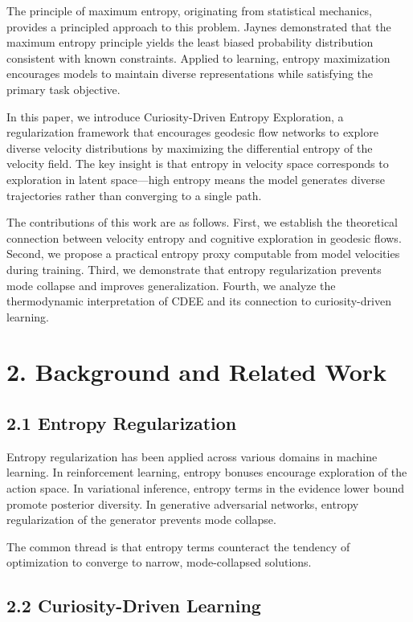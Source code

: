 \documentclass[12pt]{article}
\begin{document}
The principle of maximum entropy, originating from statistical mechanics, provides a principled approach to this problem. Jaynes demonstrated that the maximum entropy principle yields the least biased probability distribution consistent with known constraints. Applied to learning, entropy maximization encourages models to maintain diverse representations while satisfying the primary task objective.

In this paper, we introduce Curiosity-Driven Entropy Exploration, a regularization framework that encourages geodesic flow networks to explore diverse velocity distributions by maximizing the differential entropy of the velocity field. The key insight is that entropy in velocity space corresponds to exploration in latent space—high entropy means the model generates diverse trajectories rather than converging to a single path.

The contributions of this work are as follows. First, we establish the theoretical connection between velocity entropy and cognitive exploration in geodesic flows. Second, we propose a practical entropy proxy computable from model velocities during training. Third, we demonstrate that entropy regularization prevents mode collapse and improves generalization. Fourth, we analyze the thermodynamic interpretation of CDEE and its connection to curiosity-driven learning.

\section{2. Background and Related Work}

\subsection{2.1 Entropy Regularization}

Entropy regularization has been applied across various domains in machine learning. In reinforcement learning, entropy bonuses encourage exploration of the action space. In variational inference, entropy terms in the evidence lower bound promote posterior diversity. In generative adversarial networks, entropy regularization of the generator prevents mode collapse.

The common thread is that entropy terms counteract the tendency of optimization to converge to narrow, mode-collapsed solutions.

\subsection{2.2 Curiosity-Driven Learning}
\end{document}
